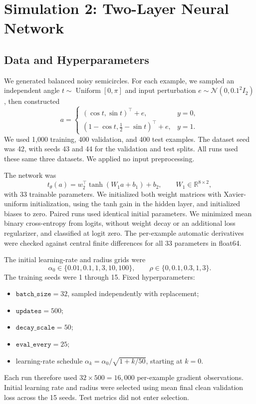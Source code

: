 \section{Simulation 2: Two-Layer Neural Network}
\label{sec:simulation2}

\subsection{Data and Hyperparameters}

We generated balanced noisy semicircles. For each example, we sampled an independent
angle $t\sim\operatorname{Uniform}[0,\pi]$ and input perturbation
$e\sim\mathcal{N}(0,0.1^2I_2)$, then constructed
\[
a=\begin{cases}
(\cos t,\sin t)^\top+e,&y=0,\\
(1-\cos t,\tfrac12-\sin t)^\top+e,&y=1.
\end{cases}
\]
We used 1,000 training, 400 validation, and 400 test examples. The dataset seed
was 42, with seeds 43 and 44 for the validation and test splits.
All runs used these same three datasets. We applied no input preprocessing.

The network was
\[
t_\theta(a)=w_2^\top\tanh(W_1a+b_1)+b_2,
\qquad W_1\in\mathbb{R}^{8\times2},
\]
with 33 trainable parameters. We initialized both weight matrices with
Xavier-uniform initialization, using the tanh gain in the hidden layer,
and initialized biases to zero. Paired runs used identical initial parameters.
We minimized mean binary cross-entropy from logits, without weight decay or an
additional loss regularizer, and classified at logit zero.
The per-example automatic derivatives were checked against central finite
differences for all 33 parameters in float64.

The initial learning-rate and radius grids were
\[
\alpha_0\in\{0.01,0.1,1,3,10,100\},\qquad
\rho\in\{0,0.1,0.3,1,3\}.
\]
The training seeds were 1 through 15.
Fixed hyperparameters:
\begin{itemize}
    \item $\texttt{batch\_size}=32$, sampled independently with replacement;
    \item $\texttt{updates}=500$;
    \item $\texttt{decay\_scale}=50$;
    \item $\texttt{eval\_every}=25$;
    \item learning-rate schedule $\alpha_k=\alpha_0/\sqrt{1+k/50}$, starting at $k=0$.
\end{itemize}
Each run therefore used $32\times500=16{,}000$ per-example gradient observations.
Initial learning rate and radius were selected using mean final clean validation
loss across the 15 seeds. Test metrics did not enter selection.

